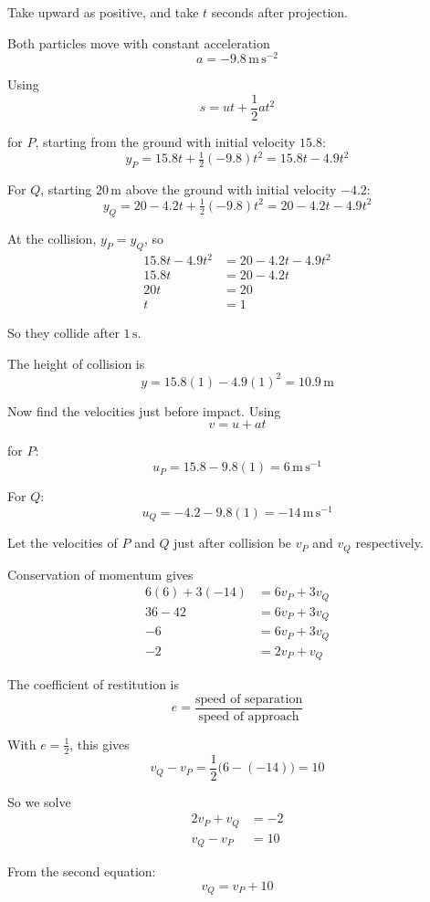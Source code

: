 \documentclass[leqno]{article}
\begin{document}
\begin{enumerate}[
  label=\textbf{\arabic*.},
  leftmargin=*,
  topsep=0pt,
  partopsep=0pt,
  parsep=0pt
]
\begin{djsSolution}
Take upward as positive, and take \(t\) seconds after projection.

Both particles move with constant acceleration
\[
a=-9.8\,\mathrm{m\,s^{-2}}
\]

Using
\[
s=ut+\frac12at^2
\]

for \(P\), starting from the ground with initial velocity \(15.8\):
\[
y_P = 15.8t+\tfrac12(-9.8)t^2=15.8t-4.9t^2
\]

For \(Q\), starting \(20\,\mathrm{m}\) above the ground with initial velocity \(-4.2\):
\[
y_Q = 20-4.2t+\tfrac12(-9.8)t^2=20-4.2t-4.9t^2
\]

At the collision, \(y_P=y_Q\), so
\begin{align*}
15.8t-4.9t^2 &= 20-4.2t-4.9t^2 \\
15.8t &= 20-4.2t \\
20t &= 20 \\
t&=1
\end{align*}

So they collide after \(1\,\mathrm{s}\).

The height of collision is
\[
y=15.8(1)-4.9(1)^2=10.9\,\mathrm{m}
\]

Now find the velocities just before impact. Using
\[
v=u+at
\]

for \(P\):
\[
u_P = 15.8-9.8(1)=6\,\mathrm{m\,s^{-1}}
\]

For \(Q\):
\[
u_Q = -4.2-9.8(1)=-14\,\mathrm{m\,s^{-1}}
\]

Let the velocities of \(P\) and \(Q\) just after collision be \(v_P\) and \(v_Q\) respectively.

Conservation of momentum gives
\begin{align*}
6(6)+3(-14)&=6v_P+3v_Q \\
36-42&=6v_P+3v_Q \\
-6&=6v_P+3v_Q \\
-2&=2v_P+v_Q
\end{align*}

The coefficient of restitution is
\[
e=\frac{\text{speed of separation}}{\text{speed of approach}}
\]

With \(e=\frac12\), this gives
\[
v_Q-v_P=\frac12\bigl(6-(-14)\bigr)=10
\]

So we solve
\begin{align*}
2v_P+v_Q&=-2 \\
v_Q-v_P&=10
\end{align*}

From the second equation:
\[
v_Q=v_P+10
\]


\end{djsSolution}
\end{enumerate}
\end{document}
